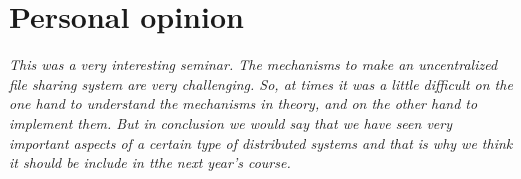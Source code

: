 \section{Personal opinion}

\textit{This was a very interesting seminar. The mechanisms to make an uncentralized file sharing system are very challenging. So, at times it was a little difficult on the one hand to understand the mechanisms in theory, and on the other hand to implement them. But in conclusion we would say that we have seen very important aspects of a certain type of distributed systems and that is why we think it should be include in tthe next year's course.}